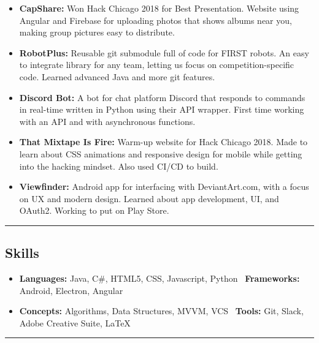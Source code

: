 \documentclass[11pt,letterpaper]{article}
\begin{document}
\begin{itemize}
	\parskip=0.1em
	
	\item \textbf{CapShare:}
		Won Hack Chicago 2018 for Best Presentation. Website using Angular and Firebase for uploading photos that shows albums near you, making group pictures easy to distribute. 
		
	\item \textbf{RobotPlus:}
		Reusable git submodule full of code for FIRST robots. An easy to integrate library for any team, letting us focus on competition-specific code. Learned advanced Java and more git features. 
		
	\item \textbf{Discord Bot:}
		A bot for chat platform Discord that responds to commands in real-time written in Python using their API wrapper. First time working with an API and with asynchronous functions.
		
	\item \textbf{That Mixtape Is Fire:}
		Warm-up website for Hack Chicago 2018. Made to learn about CSS animations and responsive design for mobile while getting into the hacking mindset. Also used CI/CD to build. 
	
	\item \textbf{Viewfinder:}
		Android app for interfacing with DeviantArt.com, with a focus on UX and modern design.  Learned about app development, UI, and OAuth2. Working to put on Play Store.

\end{itemize}

\hrule
\vspace{-0.4em}
\subsection*{Skills}

\begin{itemize}
	\parskip=0.1em

	\item \textbf{Languages:} Java, C\#, HTML5, CSS, Javascript, Python \textbullet \ 
		\textbf{Frameworks:} Android, Electron, Angular %
	\item \textbf{Concepts:} Algorithms, Data Structures, MVVM, VCS \textbullet \ 
		\textbf{Tools:} Git, Slack, Adobe Creative Suite, \LaTeX
	
\end{itemize}

\hrule
\vspace{-0.4em}
\end{document}
